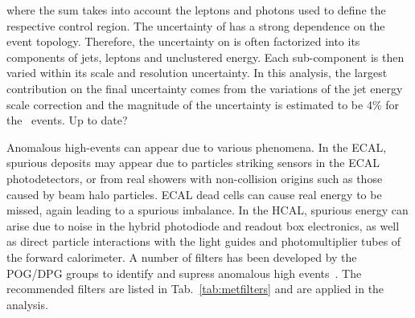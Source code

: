 where the sum takes into account the leptons and photons used to define the respective control region.
The uncertainty of \ptmiss has a strong dependence on the
event topology. Therefore, the uncertainty on \ptmiss is often factorized into its components of
jets, leptons and unclustered energy. Each sub-component is then varied
within its scale and resolution uncertainty. In this analysis, the largest
contribution on the final \ptmiss uncertainty comes from the variations of the
jet energy scale correction and the magnitude of the uncertainty is estimated
to be 4\% for the \Zvvjets~events. {\color{red} Up to date?}

Anomalous high-\ptmiss events can appear due to various phenomena.
In the ECAL, spurious deposits may appear due to particles striking
sensors in the ECAL photodetectors, or from real showers with non-collision
origins such as those caused by beam halo particles. ECAL dead cells can cause real
energy to be missed, again leading to a spurious imbalance.
In the HCAL, spurious energy can arise due to  noise in the hybrid
photodiode and readout box  electronics, as well as
direct particle interactions with  the light guides and
photomultiplier tubes of the forward calorimeter. 
A number of filters has been developed by the POG/DPG groups to identify and supress anomalous high
\ptmiss events~\cite{CMS-JME-TWIKI-FILTER}. The recommended filters are listed in Tab.~\ref{tab:metfilters} and are applied in the analysis.

